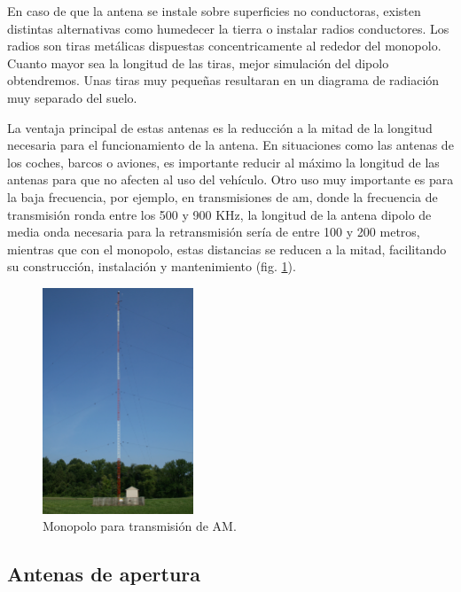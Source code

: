 \par En caso de que la antena se instale sobre superficies no conductoras, existen distintas alternativas como humedecer la tierra o instalar radios conductores. Los radios son tiras metálicas dispuestas concentricamente al rededor del monopolo. Cuanto mayor sea la longitud de las tiras, mejor simulación del dipolo obtendremos. Unas tiras muy pequeñas resultaran en un diagrama de radiación muy separado del suelo.
\\
\par La ventaja principal de estas antenas es la reducción a la mitad de la longitud necesaria para el funcionamiento de la antena. En situaciones como las antenas de los coches, barcos o aviones, es importante reducir al máximo la longitud de las antenas para que no afecten al uso del vehículo. Otro uso muy importante es para la baja frecuencia, por ejemplo, en transmisiones de \gls{am}, donde la frecuencia de transmisión ronda entre los 500 y 900 KHz, la longitud de la antena dipolo de media onda necesaria para la retransmisión sería de entre 100 y 200 metros, mientras que con el monopolo, estas distancias se reducen a la mitad, facilitando su construcción, instalación y mantenimiento (fig. \ref{fig:monopoloam}).

\begin{figure}[h]
    \centering
        \includegraphics[width=0.4\textwidth]{archivos/monopolo/monopolo}
        \caption{Monopolo para transmisión de AM. \cite{Sagdejev2008}}
        \label{fig:monopoloam}
\end{figure}

\subsection{Antenas de apertura}
